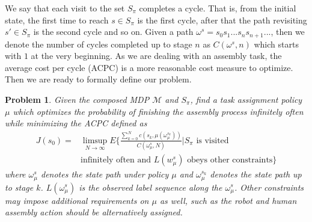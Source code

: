 \documentclass[journal]{IEEEtran}
\newtheorem{problem}{Problem}
\newtheorem{example}{Example}
\begin{document}
We say that each visit to the set $S_\pi$ completes a cycle. That is, from the initial state, the first time to reach $s\in S_\pi$ is the first cycle, after that the path revisiting $s'\in S_\pi$ is the second cycle and so on. Given a path $\omega^s=s_0s_1...s_ns_{n+1}...$, then we denote the number of cycles completed up to stage $n$ as $C(\omega^s,n)$ which starts with $1$ at the very beginning. As we are dealing with an assembly task, the average cost per cycle (ACPC) is a more reasonable cost measure \cite{ding2014optimal} to optimize. Then we are ready to formally define our problem.

\begin{problem}\label{prob:main_problem}
	Given the composed MDP $\mathcal{M}$ and $S_\pi$, find a task assignment policy $\mu$ which optimizes the probability of finishing the assembly process infinitely often while minimizing the ACPC defined as
	\begin{equation}\label{eqn:optimal}
		\begin{split}
			J(s_0)=&\limsup_{N\rightarrow\infty}E\{\frac{\sum_{k=0}^{N}c(s_k,\mu(\omega_\mu^{s_k}))}{C(\omega_\mu^s,N)}|S_\pi\text{ is visited}\\ &\text{infinitely often and $L(w^s_\mu)$ obeys other constraints}\}
		\end{split}
	\end{equation} 
	where $\omega_\mu^s$ denotes the state path under policy $\mu$ and $\omega_\mu^{s_k}$ denotes the state path up to stage $k$. $L(\omega_\mu^s)$ is the observed label sequence along the $\omega_\mu^s$. Other constraints may impose additional requirements on $\mu$ as well, such as the robot and human assembly action should be alternatively assigned.
\end{problem}
%		
%		
%		
\end{document}
